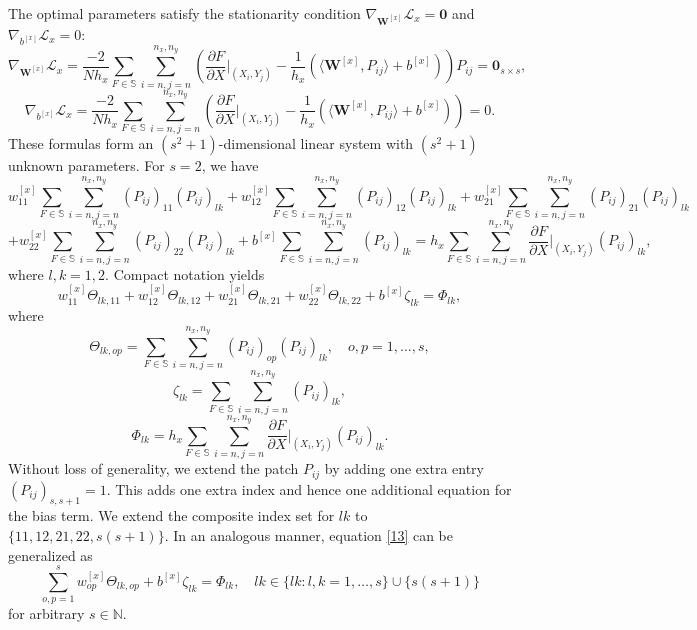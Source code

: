 \documentclass[pdflatex,sn-mathphys-num]{sn-jnl}%
\theoremstyle{thmstyleone}%
\theoremstyle{thmstyletwo}%
\theoremstyle{thmstylethree}%
\begin{document}
The optimal parameters satisfy the stationarity condition $\nabla_{\boldsymbol{W}^{[x]}}\mathcal{L}_x=\boldsymbol{0}$ and $\nabla_{b^{[x]}}\mathcal{L}_x=0$:
\[
\nabla_{\boldsymbol{W}^{[x]}}\mathcal{L}_x=\frac{-2}{{N} h_x}\sum_{F\in\mathbb{S}}\sum_{i=n,j=n}^{n_x,n_y} \left( \frac{\partial F}{\partial X}\bigg|_{(X_i,Y_j)} - \frac{1}{h_x} \left(\langle\boldsymbol{W}^{[x]}, P_{ij}\rangle + b^{[x]}\right) \right)P_{ij}=\boldsymbol{0}_{{s\times s}},
\]
\[
\nabla_{b^{[x]}}\mathcal{L}_x=\frac{-2}{{N} h_x}\sum_{F\in\mathbb{S}}\sum_{i=n,j=n}^{n_x,n_y} \left( \frac{\partial F}{\partial X}\bigg|_{(X_i,Y_j)} - \frac{1}{h_x} \left(\langle\boldsymbol{W}^{[x]}, P_{ij}\rangle + b^{[x]}\right) \right)=0.
\]
These formulas form an $(s^2+1)$-dimensional linear system with $(s^2+1)$ unknown parameters. For $s=2$, we have
\[
w_{11}^{[x]} \sum_{F\in\mathbb{S}}\sum_{i=n,j=n}^{n_x,n_y}(P_{ij})_{11} (P_{ij})_{lk}+w_{12}^{[x]} \sum_{F\in\mathbb{S}}\sum_{i=n,j=n}^{n_x,n_y}(P_{ij})_{12} (P_{ij})_{lk} +w_{21}^{[x]}\sum_{F\in\mathbb{S}} \sum_{i=n,j=n}^{n_x,n_y}(P_{ij})_{21} (P_{ij})_{lk}
\]
\[
+w_{22}^{[x]} \sum_{F\in\mathbb{S}}\sum_{i=n,j=n}^{n_x,n_y}(P_{ij})_{22} (P_{ij})_{lk} +b^{[x]}\sum_{F\in\mathbb{S}}\sum_{i=n,j=n}^{n_x,n_y}(P_{ij})_{lk}=h_x\sum_{F\in\mathbb{S}}\sum_{i=n,j=n}^{n_x,n_y}  \frac{\partial F}{\partial X}\bigg|_{(X_i,Y_j)}(P_{ij})_{lk},
\]
where $l,k=1,2$. Compact notation yields
\begin{equation}\label{13}
w_{11}^{[x]} \Theta_{lk,11}+w_{12}^{[x]} \Theta_{lk,12}+w_{21}^{[x]} \Theta_{lk,21}+w_{22}^{[x]} \Theta_{lk,22}+b^{[x]} \zeta_{lk}=\Phi_{lk},
\end{equation}
where
\begin{equation}
\Theta_{lk,op}=\sum_{F\in\mathbb{S}}\sum_{i=n,j=n}^{n_x,n_y}(P_{ij})_{op} (P_{ij})_{lk},\quad o,p=1,\ldots,s,
\end{equation}
\begin{equation}
\zeta_{lk}=\sum_{F\in\mathbb{S}}\sum_{i=n,j=n}^{n_x,n_y}(P_{ij})_{lk},
\end{equation}
\begin{equation}
\Phi_{lk}=h_x\sum_{F\in\mathbb{S}}\sum_{i=n,j=n}^{n_x,n_y}  \frac{\partial F}{\partial X}\bigg|_{(X_i,Y_j)}(P_{ij})_{lk}.
\end{equation}
Without loss of generality, we extend the patch $P_{ij}$ by adding one extra entry $(P_{ij})_{s,s+1}=1$. This adds one extra index and hence one additional equation for the bias term. We extend the composite index set for $lk$ to $\{11,12,21,22,s(s+1)\}$.
In an analogous manner, equation \eqref{13} can be generalized as
\begin{equation}\label{17}
\sum_{o,p=1}^{s}  w_{op}^{[x]} \Theta_{lk,op}+b^{[x]} \zeta_{lk}=\Phi_{lk},\quad lk\in\{lk: l,k=1,\ldots,s\}\cup \{s(s+1)\}
\end{equation}
for arbitrary $s\in\mathbb{N}$.
  
\end{document}

